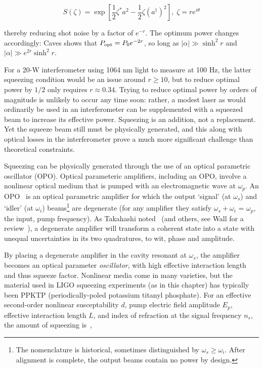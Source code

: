 \begin{equation}
S(\zeta)=\exp[\frac{1}{2}\zeta^{*}a^{2}-\frac{1}{2}\zeta(a^{\dagger})^{2}],\;\zeta=re^{i\theta}
\label{squeeze_operator_caves}
\end{equation}

\noindent thereby reducing shot noise by a factor of $e^{-r}$. The optimum power changes accordingly: Caves shows that $P_\textup{opt} = P_0 e^{-2r}$, so long as $|\alpha|\gg\sinh^2r$ and $|\alpha|\gg e^{2r}\sinh^2 r$. 

For a 20-W interferometer using 1064 nm light to measure at 100 Hz, the latter squeezing condition would be an issue around $r\geq10$, but to reduce optimal power by $1/2$ only requires $r \approx 0.34$. 
Trying to reduce optimal power by orders of magnitude is unlikely to occur any time soon: rather, a modest laser as would ordinarily be used in an interferometer can be supplemented with a squeezed beam to increase its effective power. 
Squeezing is an addition, not a replacement.
Yet the squeeze beam still must be physically generated, and this along with optical losses in the interferometer prove a much more significant challenge than theoretical constraints.

Squeezing can be physically generated through the use of an optical parametric oscillator (OPO).
Optical parameteric amplifiers, including an OPO, involve a nonlinear optical medium that is pumped with an electromagnetic wave at $\omega_p$.
An OPO~\cite{Caves1981} is an optical parametric amplifier for which the output `signal' (at $\omega_s$) and `idler' (at $\omega_i$) beams\footnote{The nomenclature is historical, sometimes distinguished by $\omega_s\geq\omega_i$. After alignment is complete, the output beams contain no power by design.} are degenerate (for any amplifier they satisfy $\omega_s + \omega_i$ = $\omega_p$, the input, pump frequency).
As Takahashi noted~\cite{Takahashi1965} (and others, see Wall for a review~\cite{Walls1983}), a degenerate amplifier will transform a coherent state into a state with unequal uncertainties in its two quadratures, to wit, phase and amplitude.

By placing a degenerate amplifier in the cavity resonant at $\omega_s$, the amplifier becomes an optical parameter \textit{oscillator}, with high effective interaction length and thus squeeze factor.
Nonlinear media come in many varieties, but the material used in LIGO squeezing experiments (as in this chapter) has typically been PPKTP (periodically-poled potassium titanyl phosphate).
For an effective second-order nonlinear susceptability $d$, pump electric field amplitude $E_p$, effective interaction length $L$, and index of refraction at the signal frequency $n_s$, the amount of squeezing is~\cite{Caves1981},

